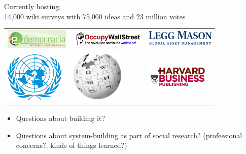 \documentclass[aspectratio=169]{beamer}
\def\vf{\vfill}
\begin{document}
\begin{frame}

Currently hosting:\\
14,000 wiki surveys with 75,000 ideas and 23 million votes
\vf

\begin{center}
\begin{tabular}{m{1.4in} m{1.4in} m{1.4in}}
\includegraphics[width=1.2in]{figures/edemocracia} & \includegraphics[width=1.4in]{figures/ows_horizontal} & \includegraphics[width=1.3in]{figures/legg_mason_logo}\\
\vspace{0.2in}
\includegraphics[width=1.1in]{figures/un_logo_white_bkg} & \includegraphics[width=1in]{figures/200px-Wikipedia-logo} & \includegraphics[width=1.2in]{figures/harvard_business_publishing}
\end{tabular}
\end{center}

\end{frame}
\begin{frame}

\begin{itemize}
\item Questions about building it?
\item Questions about system-building as part of social research? (professional concerns?, kinds of things learned?)
\end{itemize}

\end{frame}
\end{document}
